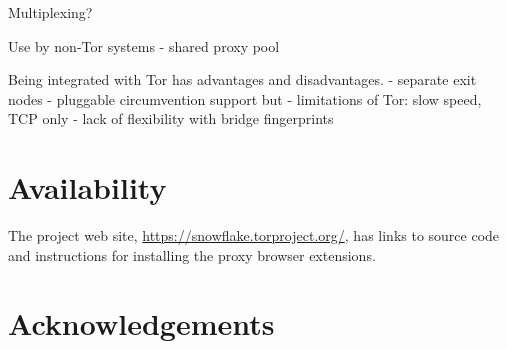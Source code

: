\documentclass[letterpaper,twocolumn]{article}
\begin{document}
Multiplexing?

Use by non-Tor systems
- shared proxy pool

Being integrated with Tor has advantages and disadvantages.
- separate exit nodes
- pluggable circumvention support
but
- limitations of Tor: slow speed, TCP only
- lack of flexibility with bridge fingerprints

\section*{Availability}

The project web site,
\url{https://snowflake.torproject.org/},
has links to source code
and instructions for installing the proxy browser extensions.

\section*{Acknowledgements}
\end{document}
